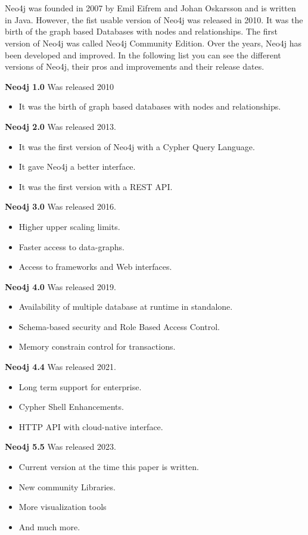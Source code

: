 
\section{} \label{sec:history}
Neo4j was founded in 2007 by Emil Eifrem and Johan Oskarsson and is written in Java.
However, the fist usable version of Neo4j was released in 2010.
It was the birth of the graph based Databases with nodes and relationships.
The first version of Neo4j was called Neo4j Community Edition.
Over the years, Neo4j has been developed and improved.
In the following list you can see the different versions of Neo4j, their pros and improvements and their release dates.

\textbf{Neo4j 1.0} Was released 2010
\begin{itemize}
    \item It was the birth of graph based databases with nodes and relationships.
\end{itemize}
\textbf{Neo4j 2.0} Was released 2013.
\begin{itemize}
    \item It was the first version of Neo4j with a Cypher Query Language.
    \item It gave Neo4j a better interface.
    \item It was the first version with a REST API.
\end{itemize}
\textbf{Neo4j 3.0} Was released 2016.
\begin{itemize}
    \item Higher upper scaling limits.
    \item Faster access to data-graphs.
    \item Access to frameworks and Web interfaces.
\end{itemize}
\textbf{Neo4j 4.0} Was released 2019.
\begin{itemize}
    \item Availability of multiple database at runtime in standalone.
    \item Schema-based security and Role Based Access Control.
    \item Memory constrain control for transactions.
\end{itemize}
\textbf{Neo4j 4.4} Was released 2021.
\begin{itemize}
    \item Long term support for enterprise.
    \item Cypher Shell Enhancements.
    \item HTTP API with cloud-native interface.
\end{itemize}
\textbf{Neo4j 5.5} Was released 2023.
\begin{itemize}
    \item Current version at the time this paper is written.
    \item New community Libraries.
    \item More visualization tools
    \item And much more.
\end{itemize}
